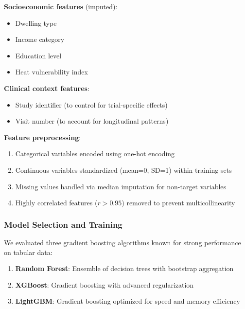 \textbf{Socioeconomic features} (imputed):
\begin{itemize}
    \item Dwelling type
    \item Income category
    \item Education level
    \item Heat vulnerability index
\end{itemize}

\textbf{Clinical context features}:
\begin{itemize}
    \item Study identifier (to control for trial-specific effects)
    \item Visit number (to account for longitudinal patterns)
\end{itemize}

\textbf{Feature preprocessing}:
\begin{enumerate}
    \item Categorical variables encoded using one-hot encoding
    \item Continuous variables standardized (mean=0, SD=1) within training sets
    \item Missing values handled via median imputation for non-target variables
    \item Highly correlated features ($r > 0.95$) removed to prevent multicollinearity
\end{enumerate}

\subsubsection{Model Selection and Training}

We evaluated three gradient boosting algorithms known for strong performance on tabular data:

\begin{enumerate}
    \item \textbf{Random Forest}: Ensemble of decision trees with bootstrap aggregation
    \item \textbf{XGBoost}: Gradient boosting with advanced regularization
    \item \textbf{LightGBM}: Gradient boosting optimized for speed and memory efficiency
\end{enumerate}

